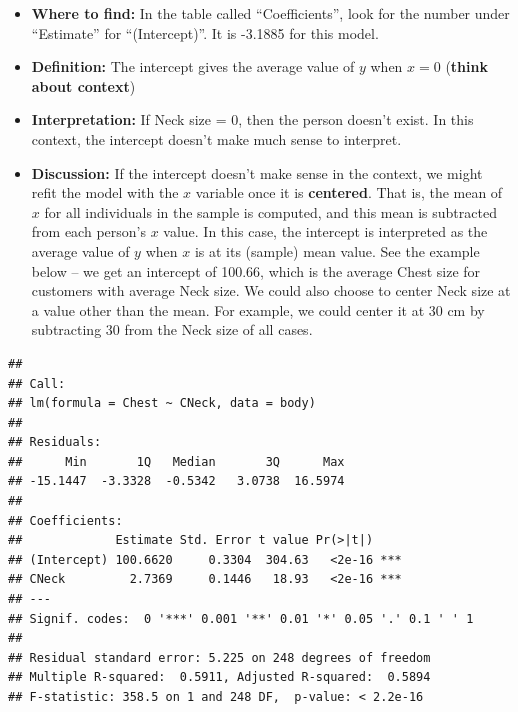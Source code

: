 \documentclass[
]{book}
\newenvironment{Shaded}{\begin{snugshade}}{\end{snugshade}}
\newcommand{\DataTypeTok}[1]{\textcolor[rgb]{0.13,0.29,0.53}{#1}}
\newcommand{\KeywordTok}[1]{\textcolor[rgb]{0.13,0.29,0.53}{\textbf{#1}}}
\newcommand{\NormalTok}[1]{#1}
\newcommand{\OperatorTok}[1]{\textcolor[rgb]{0.81,0.36,0.00}{\textbf{#1}}}
\newcommand{\StringTok}[1]{\textcolor[rgb]{0.31,0.60,0.02}{#1}}
\providecommand{\tightlist}{%
  \setlength{\itemsep}{0pt}\setlength{\parskip}{0pt}}
\begin{document}
\begin{itemize}
\tightlist
\item
  \textbf{Where to find:} In the table called ``Coefficients'', look for the number under ``Estimate'' for ``(Intercept)''. It is -3.1885 for this model.
\item
  \textbf{Definition:} The intercept gives the average value of \(y\) when \(x=0\) (\textbf{think about context})
\item
  \textbf{Interpretation:} If Neck size = 0, then the person doesn't exist. In this context, the intercept doesn't make much sense to interpret.
\item
  \textbf{Discussion:} If the intercept doesn't make sense in the context, we might refit the model with the \(x\) variable once it is \textbf{centered}. That is, the mean of \(x\) for all individuals in the sample is computed, and this mean is subtracted from each person's \(x\) value. In this case, the intercept is interpreted as the average value of \(y\) when \(x\) is at its (sample) mean value. See the example below -- we get an intercept of 100.66, which is the average Chest size for customers with average Neck size. We could also choose to center Neck size at a value other than the mean. For example, we could center it at 30 cm by subtracting 30 from the Neck size of all cases.
\end{itemize}

\begin{Shaded}
\end{Shaded}

\begin{verbatim}
## 
## Call:
## lm(formula = Chest ~ CNeck, data = body)
## 
## Residuals:
##      Min       1Q   Median       3Q      Max 
## -15.1447  -3.3328  -0.5342   3.0738  16.5974 
## 
## Coefficients:
##             Estimate Std. Error t value Pr(>|t|)    
## (Intercept) 100.6620     0.3304  304.63   <2e-16 ***
## CNeck         2.7369     0.1446   18.93   <2e-16 ***
## ---
## Signif. codes:  0 '***' 0.001 '**' 0.01 '*' 0.05 '.' 0.1 ' ' 1
## 
## Residual standard error: 5.225 on 248 degrees of freedom
## Multiple R-squared:  0.5911,	Adjusted R-squared:  0.5894 
## F-statistic: 358.5 on 1 and 248 DF,  p-value: < 2.2e-16
\end{verbatim}
\end{document}
